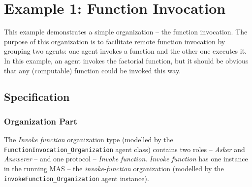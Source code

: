 
\section{Example 1: Function Invocation}

This example demonstrates a simple organization -- the function invocation.
The purpose of this organization is to facilitate remote function invocation by grouping two agents: one agent invokes a function and the other one executes it.
In this example, an agent invokes the factorial function, but it should be obvious that any (computable) function could be invoked this way.

\subsection*{Specification}

\subsubsection*{Organization Part}

The \textit{Invoke function} organization type (modelled by the \texttt{FunctionInvocation\_Organization} agent class) contains two roles -- \textit{Asker} and \textit{Answerer} -- and one protocol -- \textit{Invoke function}.
\textit{Invoke function} has one instance in the running MAS -- the \textit{invoke-function} organization (modelled by the \texttt{invokeFunction\_Organization} agent instance).

